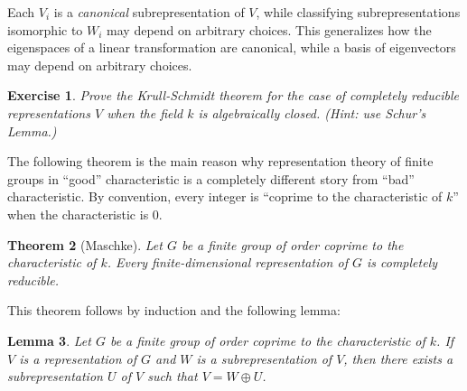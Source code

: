\documentclass[12pt]{article}
\theoremstyle{plain}
\newtheorem{theorem}{Theorem}[section]
\newtheorem{lemma}[theorem]{Lemma}
\newtheorem{exercise}[theorem]{Exercise}
\theoremstyle{definition}
\theoremstyle{remark}
\numberwithin{equation}{section}
\begin{document}
Each $V_i$ is a \emph{canonical} subrepresentation of $V$,
while classifying subrepresentations isomorphic to $W_i$ may depend on
arbitrary choices.
This generalizes how the eigenspaces of a linear transformation
are canonical, while a basis of eigenvectors
may depend on arbitrary choices.

\begin{exercise}
Prove the Krull-Schmidt theorem for the case of completely reducible
representations $V$ when the field $k$ is algebraically closed.
(Hint: use Schur's Lemma.)
\end{exercise}

The following theorem is the main reason why representation theory of finite
groups in ``good'' characteristic is a completely different story from
``bad'' characteristic.
By convention, every integer is ``coprime to the characteristic of $k$''
when the characteristic is $0$.

\begin{theorem}[Maschke]
Let $G$ be a finite group of order coprime to the characteristic of $k$.
Every finite-dimensional representation of $G$ is completely reducible.
\end{theorem}

This theorem follows by induction and the following lemma:

\begin{lemma}
Let $G$ be a finite group of order coprime to the characteristic of $k$.
If $V$ is a representation of $G$ and $W$ is a subrepresentation of $V$,
then there exists a subrepresentation $U$ of $V$
such that $V= W \oplus U$.
\end{lemma}
\end{document}
